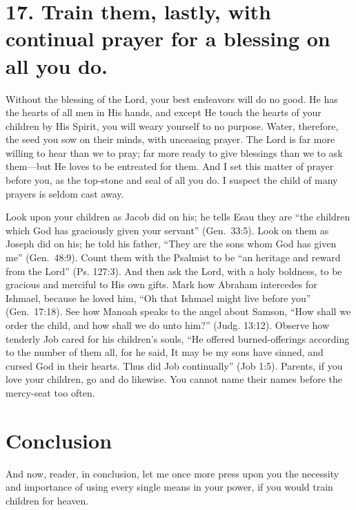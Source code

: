 \documentclass[
]{book}
\begin{document}
\hypertarget{train-them-lastly-with-continual-prayer-for-a-blessing-on-all-you-do.}{%
\section*{17. Train them, lastly, with continual prayer for a blessing on all you do.}\label{train-them-lastly-with-continual-prayer-for-a-blessing-on-all-you-do.}}

Without the blessing of the Lord, your best endeavors will do no good. He has the hearts of all men in His hands, and except He touch the hearts of your children by His Spirit, you will weary yourself to no purpose. Water, therefore, the seed you sow on their minds, with unceasing prayer. The Lord is far more willing to hear than we to pray; far more ready to give blessings than we to ask them---but He loves to be entreated for them. And I set this matter of prayer before you, as the top-stone and seal of all you do. I suspect the child of many prayers is seldom cast away.

Look upon your children as Jacob did on his; he tells Esau they are ``the children which God has graciously given your servant'' (Gen.~33:5). Look on them as Joseph did on his; he told his father, ``They are the sons whom God has given me'' (Gen.~48:9). Count them with the Psalmist to be ``an heritage and reward from the Lord'' (Ps. 127:3). And then ask the Lord, with a holy boldness, to be gracious and merciful to His own gifts. Mark how Abraham intercedes for Ishmael, because he loved him, ``Oh that Ishmael might live before you'' (Gen.~17:18). See how Manoah speaks to the angel about Samson, ``How shall we order the child, and how shall we do unto him?'' (Judg. 13:12). Observe how tenderly Job cared for his children's souls, ``He offered burned-offerings according to the number of them all, for he said, It may be my sons have sinned, and cursed God in their hearts. Thus did Job continually'' (Job 1:5). Parents, if you love your children, go and do likewise. You cannot name their names before the mercy-seat too often.

\hypertarget{conclusion}{%
\section*{Conclusion}\label{conclusion}}

And now, reader, in conclusion, let me once more press upon you the necessity and importance of using every single means in your power, if you would train children for heaven.
\end{document}
